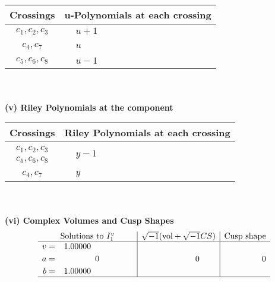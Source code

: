 \documentclass[1p]{elsarticle_modified}
\theoremstyle{definition}
\newcommand{\I}{\sqrt{-1}}
\begin{document}
\begin{tabular}{m{50pt}|m{274pt}}
Crossings & \hspace{64pt}u-Polynomials at each crossing \\
\hline $$\begin{aligned}c_{1},c_{2},c_{3}\end{aligned}$$&$\begin{aligned}
&u+1
\end{aligned}$\\
\hline $$\begin{aligned}c_{4},c_{7}\end{aligned}$$&$\begin{aligned}
&u
\end{aligned}$\\
\hline $$\begin{aligned}c_{5},c_{6},c_{8}\end{aligned}$$&$\begin{aligned}
&u-1
\end{aligned}$\\
\hline
\end{tabular}\\~\\
\newpage\renewcommand{\arraystretch}{1}
\flushleft \textbf{(v) Riley Polynomials at the component}\newline \\
\begin{tabular}{m{50pt}|m{274pt}}
Crossings & \hspace{64pt}Riley Polynomials at each crossing \\
\hline $$\begin{aligned}c_{1},c_{2},c_{3}\\c_{5},c_{6},c_{8}\end{aligned}$$&$\begin{aligned}
&y-1
\end{aligned}$\\
\hline $$\begin{aligned}c_{4},c_{7}\end{aligned}$$&$\begin{aligned}
&y
\end{aligned}$\\
\hline
\end{tabular}\\~\\
\newpage\flushleft \textbf{(vi) Complex Volumes and Cusp Shapes}
$$\begin{array}{c|c|c}  
\text{Solutions to }I^v_{1}& \I (\text{vol} + \sqrt{-1}CS) & \text{Cusp shape}\\
 \hline 
\begin{aligned}
v &= \phantom{-}1.00000\phantom{ +0.000000I} \\
a &= \phantom{-0.000000 } 0 \\
b &= \phantom{-}1.00000\phantom{ +0.000000I}\end{aligned}
 & \phantom{-0.000000 } 0 & \phantom{-0.000000 } 0\\
 \hline 
 \end{array}$$\newpage
\end{document}
